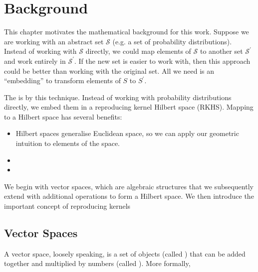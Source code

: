 \chapter{Background}
This chapter motivates the mathematical background for this work.  Suppose we are working with an abstract set $\mathcal{S}$ (e.g. a set of probability distributions). Instead of working with $\mathcal{S}$ directly, we could map elements of $\mathcal{S}$ to another set $\mathcal{S}^\prime$ and work entirely in $\mathcal{S}^\prime$. If the new set is easier to work with, then this approach could be better than working with the original set. All we need is an ``embedding'' to transform elements of $S$ to $S^\prime$.

The  is  by this technique. Instead of working with probability distributions directly, we embed them in a reproducing kernel Hilbert space (RKHS). Mapping to a Hilbert space has several benefits:
%
\begin{itemize}
  \item Hilbert spaces generalise Euclidean space, so we can apply our geometric intuition to elements of the space.
  \item {}
  \item {}
\end{itemize}
%
We begin with vector spaces, which are algebraic structures that we subsequently extend with additional operations to form a Hilbert space. We then introduce the important concept of reproducing kernels

\section{Vector Spaces}
A vector space, loosely speaking, is a set of objects (called ) that can be added together and multiplied by numbers (called ). More formally,

